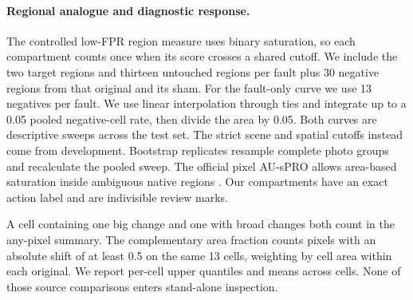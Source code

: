 \paragraph{Regional analogue and diagnostic response.}
The controlled low-FPR region measure uses binary saturation, so each compartment counts once when its score crosses a shared cutoff. We include the two target regions and thirteen untouched regions per fault plus 30 negative regions from that original and its sham. For the fault-only curve we use 13 negatives per fault. We use linear interpolation through ties and integrate up to a 0.05 pooled negative-cell rate, then divide the area by 0.05. Both curves are descriptive sweeps across the test set. The strict scene and spatial cutoffs instead come from development. Bootstrap replicates resample complete photo groups and recalculate the pooled sweep. The official pixel AU-sPRO allows area-based saturation inside ambiguous native regions \cite{bergmann2022}. Our compartments have an exact action label and are indivisible review marks.

A cell containing one big change and one with broad changes both count in the any-pixel summary. The complementary area fraction counts pixels with an absolute shift of at least 0.5 on the same 13 cells, weighting by cell area within each original. We report per-cell upper quantiles and means across cells. None of those source comparisons enters stand-alone inspection.

